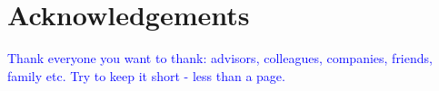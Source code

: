 \section*{Acknowledgements}

\textcolor{blue}{Thank everyone you want to thank: advisors, colleagues, companies, friends, family etc. Try to keep it 
short - less than a page.}

\cleardoublepage
